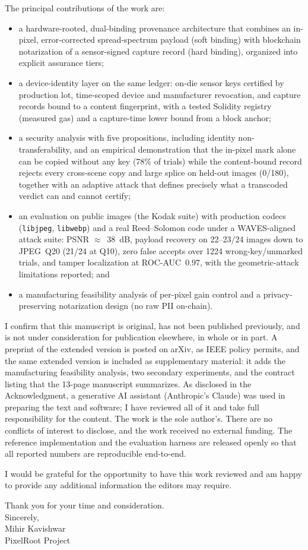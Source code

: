 \documentclass[11pt]{article}
\begin{document}
The principal contributions of the work are:
\begin{itemize}
  \item a hardware-rooted, dual-binding provenance architecture that combines an
        in-pixel, error-corrected spread-spectrum payload (soft binding) with
        blockchain notarization of a sensor-signed capture record (hard
        binding), organized into explicit assurance tiers;
  \item a device-identity layer on the same ledger: on-die sensor keys certified
        by production lot, time-scoped device and manufacturer revocation, and
        capture records bound to a content fingerprint, with a tested Solidity
        registry (measured gas) and a capture-time lower bound from a block
        anchor;
  \item a security analysis with five propositions, including identity
        non-transferability, and an empirical demonstration that the in-pixel
        mark alone can be copied without any key (78\% of trials) while the
        content-bound record rejects every cross-scene copy and large splice on
        held-out images (0/180), together with an adaptive attack that defines
        precisely what a transcoded verdict can and cannot certify;
  \item an evaluation on public images (the Kodak suite) with production codecs
        (\texttt{libjpeg}, \texttt{libwebp}) and a real Reed--Solomon code under a
        WAVES-aligned attack suite: PSNR $\approx$~38~dB, payload recovery on
        22--23/24 images down to JPEG~Q20 (21/24 at Q10), zero false accepts over
        1224 wrong-key/unmarked trials, and tamper localization at
        ROC-AUC~$0.97$, with the geometric-attack limitations reported; and
  \item a manufacturing feasibility analysis of per-pixel gain control and a
        privacy-preserving notarization design (no raw PII on-chain).
\end{itemize}

I confirm that this manuscript is original, has not been published previously,
and is not under consideration for publication elsewhere, in whole or in part.
A preprint of the extended version is posted on arXiv, as IEEE policy permits,
and the same extended version is included as supplementary material: it adds the
manufacturing feasibility analysis, two secondary experiments, and the contract
listing that the 13-page manuscript summarizes. As disclosed in the
Acknowledgment, a generative AI assistant (Anthropic's Claude) was used in
preparing the text and software; I have reviewed all of it and take full
responsibility for the content.
The work is the sole author's. There are no conflicts of interest to disclose,
and the work received no external funding. The reference implementation and the
evaluation harness are released openly so that all reported numbers are
reproducible end-to-end.

I would be grateful for the opportunity to have this work reviewed and am happy
to provide any additional information the editors may require.

Thank you for your time and consideration.\\[1.5em]

\noindent Sincerely,\\[0.5em]
\noindent Mihir Kavishwar\\
PixelRoot Project
\end{document}
